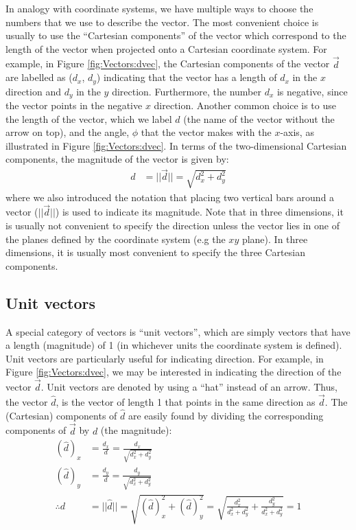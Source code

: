 In analogy with coordinate systems, we have multiple ways to choose the numbers that we use to describe the vector. The most convenient choice is usually to use the ``Cartesian components'' of the vector which correspond to the length of the vector when projected onto a Cartesian coordinate system. For example, in Figure \ref{fig:Vectors:dvec}, the Cartesian components of the vector $\vec d$ are labelled as ($d_x$, $d_y$) indicating that the vector has a length of $d_x$ in the $x$ direction and $d_y$ in the $y$ direction. Furthermore, the number $d_x$ is negative, since the vector points in the negative $x$ direction. Another common choice is to use the length of the vector, which we label $d$ (the name of the vector without the arrow on top), and the angle, $\phi$ that the vector makes with the $x$-axis, as illustrated in Figure \ref{fig:Vectors:dvec}. In terms of the two-dimensional Cartesian components, the magnitude of the vector is given by:
\begin{align*}
d&= ||\vec d||= \sqrt{d_x^2+d_y^2}
\end{align*}
where we also introduced the notation that placing two vertical bars around a vector ($||\vec d||$) is used to indicate its magnitude. Note that in three dimensions, it is usually not convenient to specify the direction unless the vector lies in one of the planes defined by the coordinate system (e.g the $xy$ plane). In three dimensions, it is usually most convenient to specify the three Cartesian components.


\subsection{Unit vectors} 
A special category of vectors is ``unit vectors'', which are simply vectors that have a length (magnitude) of 1 (in whichever units the coordinate system is defined). Unit vectors are particularly useful for indicating direction. For example, in Figure \ref{fig:Vectors:dvec}, we may be interested in indicating the direction of the vector $\vec d$. Unit vectors are denoted by using a ``hat'' instead of an arrow. Thus, the vector $\hat d$, is the vector of length 1 that points in the same direction as $\vec d$. The (Cartesian) components of $\hat d$ are easily found by dividing the corresponding components of $\vec d$ by $d$ (the magnitude):
\begin{align*}
(\hat d)_x &= \frac{d_x}{d}=\frac{d_x}{\sqrt{d_x^2+d_y^2}}\\
(\hat d)_y &= \frac{d_y}{d}=\frac{d_y}{\sqrt{d_x^2+d_y^2}}\\
\therefore d &= ||\hat d||=\sqrt{(\hat d)_x^2+(\hat d)_y^2}=\sqrt{\frac{d_x^2}{d_x^2+d_y^2}+\frac{d_y^2}{d_x^2+d_y^2}}=1
\end{align*}

